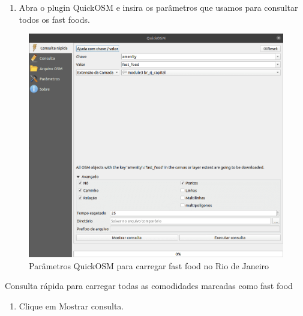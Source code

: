 \documentclass[
]{krantz}
\providecommand{\tightlist}{%
  \setlength{\itemsep}{0pt}\setlength{\parskip}{0pt}}
\begin{document}
\begin{enumerate}
\def\labelenumi{\arabic{enumi}.}
\tightlist
\item
  Abra o plugin QuickOSM e insira os parâmetros que usamos para consultar todos os fast foods.
\end{enumerate}

\begin{figure}
\centering
\includegraphics{media/modulo3/quickosm-6.png}
\caption{Parâmetros QuickOSM para carregar fast food no Rio de Janeiro}
\end{figure}

Consulta rápida para carregar todas as comodidades marcadas como fast food

\begin{enumerate}
\def\labelenumi{\arabic{enumi}.}
\setcounter{enumi}{1}
\tightlist
\item
  Clique em Mostrar consulta.
\end{enumerate}
\end{document}
